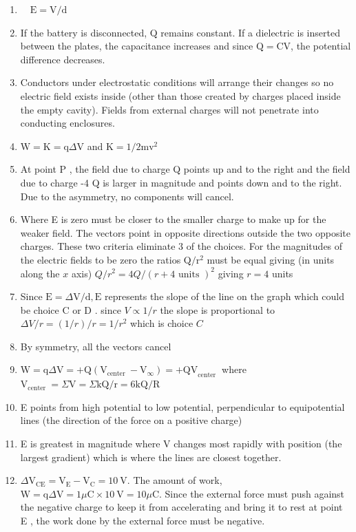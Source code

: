 \begin{enumerate}
\begin{enumerate}
  \item $\quad \mathrm{E}=\mathrm{V} / \mathrm{d}$
  \item If the battery is disconnected, Q remains constant. If a dielectric is inserted between the plates, the capacitance increases and since $\mathrm{Q}=\mathrm{CV}$, the potential difference decreases.
  \item Conductors under electrostatic conditions will arrange their changes so no electric field exists inside (other than those created by charges placed inside the empty cavity). Fields from external charges will not penetrate into conducting enclosures.
  \item $\mathrm{W}=\mathrm{K}=\mathrm{q} \Delta \mathrm{V}$ and $\mathrm{K}=1 / 2 \mathrm{mv}^{2}$
  \item At point P , the field due to charge Q points up and to the right and the field due to charge -4 Q is larger in magnitude and points down and to the right. Due to the asymmetry, no components will cancel.
  \item Where E is zero must be closer to the smaller charge to make up for the weaker field. The vectors point in opposite directions outside the two opposite charges. These two criteria eliminate 3 of the choices. For the magnitudes of the electric fields to be zero the ratios $\mathrm{Q} / \mathrm{r}^{2}$ must be equal giving (in units along the $x$ axis) $Q / r^{2}=4 Q /(r+4 \text { units })^{2}$ giving $r=4$ units
  \item Since $\mathrm{E}=\Delta \mathrm{V} / \mathrm{d}, \mathrm{E}$ represents the slope of the line on the graph which could be choice C or D . since $V \propto 1 / r$ the slope is proportional to $\Delta V / r=(1 / r) / r=1 / r^{2}$ which is choice $C$
  \item By symmetry, all the vectors cancel
  \item $\mathrm{W}=\mathrm{q} \Delta \mathrm{V}=+\mathrm{Q}\left(\mathrm{V}_{\text {center }}-\mathrm{V}_{\infty}\right)=+\mathrm{QV}_{\text {center }}$ where $\mathrm{V}_{\text {center }}=\Sigma \mathrm{V}=\Sigma \mathrm{kQ} / \mathrm{r}=6 \mathrm{kQ} / \mathrm{R}$
  \item E points from high potential to low potential, perpendicular to equipotential lines (the direction of the force on a positive charge)
  \item E is greatest in magnitude where V changes most rapidly with position (the largest gradient) which is where the lines are closest together.
  \item $\Delta \mathrm{V}_{\mathrm{CE}}=\mathrm{V}_{\mathrm{E}}-\mathrm{V}_{\mathrm{C}}=10 \mathrm{~V}$. The amount of work, $\mathrm{W}=\mathrm{q} \Delta \mathrm{V}=1 \mu \mathrm{C} \times 10 \mathrm{~V}=10 \mu \mathrm{C}$. Since the external force must push against the negative charge to keep it from accelerating and bring it to rest at point E , the work done by the external force must be negative.

\end{enumerate}
\end{enumerate}
